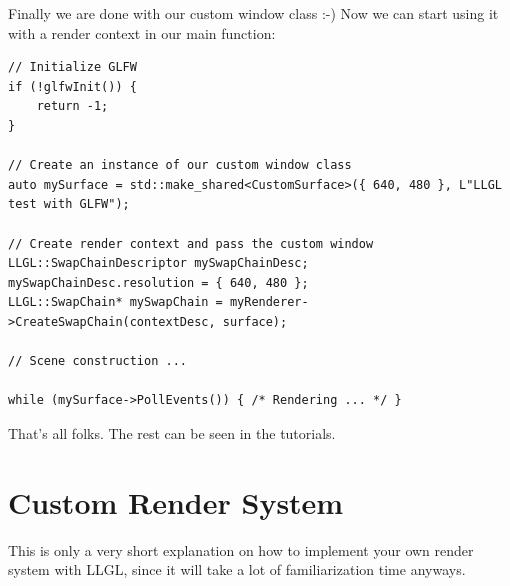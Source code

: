 \documentclass{article}
\begin{document}
Finally we are done with our custom window class :-) Now we can start using it with a render context in our main function:
\begin{lstlisting}
// Initialize GLFW
if (!glfwInit()) {
	return -1;
}

// Create an instance of our custom window class
auto mySurface = std::make_shared<CustomSurface>({ 640, 480 }, L"LLGL test with GLFW");

// Create render context and pass the custom window
LLGL::SwapChainDescriptor mySwapChainDesc;
mySwapChainDesc.resolution = { 640, 480 };
LLGL::SwapChain* mySwapChain = myRenderer->CreateSwapChain(contextDesc, surface);

// Scene construction ...

while (mySurface->PollEvents()) { /* Rendering ... */ }
\end{lstlisting}
That's all folks. The rest can be seen in the tutorials.



\newpage
\section{Custom Render System}
\label{sec:custom_renderer}

This is only a very short explanation on how to implement your own render system with LLGL,
since it will take a lot of familiarization time anyways.
\end{document}
